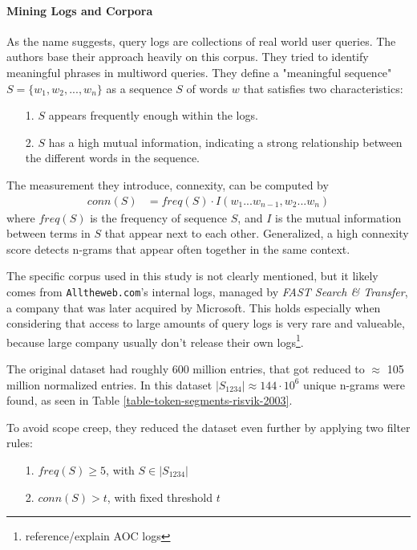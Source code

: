 \paragraph*{Mining Logs and Corpora}
As the name suggests, query logs are collections of real world user queries. The authors base their approach heavily on this corpus. They tried to identify meaningful phrases in multiword queries.
They define a "meaningful sequence" $S = \{w_1,w_2,...,w_n\}$ as a sequence  $S$ of words $w$ that satisfies two characteristics:
\begin{enumerate}
\item[1.] $S$ appears frequently enough within the logs.
\item[2.] $S$ has a high mutual information, indicating a strong relationship between the different words in the sequence.
\end{enumerate}

The measurement they introduce, connexity, can be computed by
\begin{align*}
conn(S) &= freq(S) \cdot I(w_1...w_{n-1},w_2...w_n)
\end{align*}
where $freq(S)$ is the frequency of sequence $S$, and $I$ is the mutual information between terms in $S$ that appear next to each other.
Generalized, a high connexity score detects n-grams that appear often together in the same context.

The specific corpus used in this study is not clearly mentioned, but it likely comes from \texttt{Alltheweb.com}'s internal logs, managed by \textit{FAST Search \& Transfer}, a company that was later acquired by Microsoft. This holds especially when considering that access to large amounts of query logs is very rare and valueable, because large company usually don't release their own logs\footnote{reference/explain AOC logs}.



The original dataset had roughly 600 million entries, that got reduced to $\approx$ 105 million normalized entries. In this dataset $|S_{1234}| \approx 144 \cdot 10^6$ unique n-grams were found, as seen in Table \ref{table-token-segments-risvik-2003}.


To avoid scope creep, they reduced the dataset even further by applying two filter rules:
\begin{enumerate}
\item[1.] $freq(S) \ge 5$, with $S \in |S_{1234}|$
\item[2.] $conn(S) > t$, with fixed threshold $t$
\end{enumerate}

